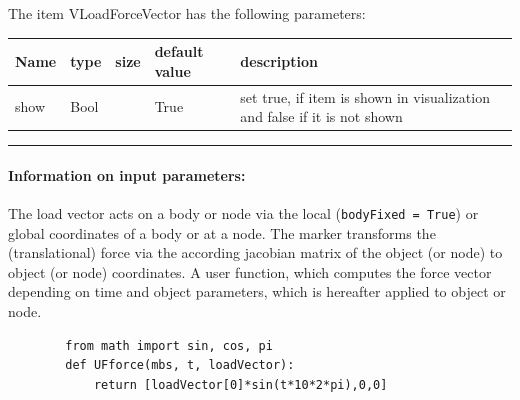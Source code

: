 \noindent The item VLoadForceVector has the following parameters:
\begin{center}
  \footnotesize
  \begin{longtable}{| p{4.5cm} | p{2.5cm} | p{0.5cm} | p{2.5cm} | p{6cm} |}
    \hline
    \bf Name & \bf type & \bf size & \bf default value & \bf description \\ \hline
    show &     Bool &      &     True &     set true, if item is shown in visualization and false if it is not shown\\ \hline
\end{longtable}
\end{center}
\par\noindent\rule{\textwidth}{0.4pt}
\label{description_LoadForceVector}
\paragraph{Information on input parameters:} 
\finishTable
 \noindent
    The load vector acts on a body or node via the local (\texttt{bodyFixed = True}) or global coordinates of a body or at a node. 
    The marker transforms the (translational) force via the according jacobian matrix of the object (or node) to object (or node) coordinates.
    A user function, which computes the force vector depending on time and object parameters, which is hereafter applied to object or node.
    \finishTable
    \userFunctionExample{}
    \pythonstyle\begin{lstlisting}
        from math import sin, cos, pi
        def UFforce(mbs, t, loadVector): 
            return [loadVector[0]*sin(t*10*2*pi),0,0]
    \end{lstlisting}
